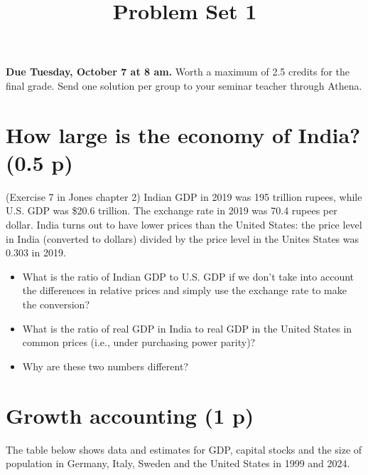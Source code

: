 \documentclass[12pt,a4paper]{article}
\title{Problem Set 1}        %
\begin{document}
\maketitle

\textbf{Due Tuesday, October 7 at 8 am.} Worth a maximum of 2.5 credits for the final grade. Send one solution per group to your seminar teacher through Athena.

\section{How large is the economy of India? (0.5 p)}
(Exercise 7 in Jones chapter 2)
Indian GDP in 2019 was 195 trillion rupees, while U.S. GDP was \$20.6 trillion. The exchange rate in 2019 was 70.4 rupees per dollar. India turns out to have lower prices than the United States: the price level in India (converted to dollars) divided by the price level in the Unites States was 0.303 in 2019.
\begin{itemize}
    \item[a.] What is the ratio of Indian GDP to U.S. GDP if we don't take into account the differences in relative prices and simply use the exchange rate to make the conversion?
    \item[b.] What is the ratio of real GDP in India to real GDP in the United States in common prices (i.e., under purchasing power parity)?
    \item[c.] Why are these two numbers different?
\end{itemize}

\section{Growth accounting (1 p)}

The table below shows data and estimates for GDP, capital stocks and the size of population in Germany, Italy, Sweden and the United States in 1999 and 2024.
\end{document}

